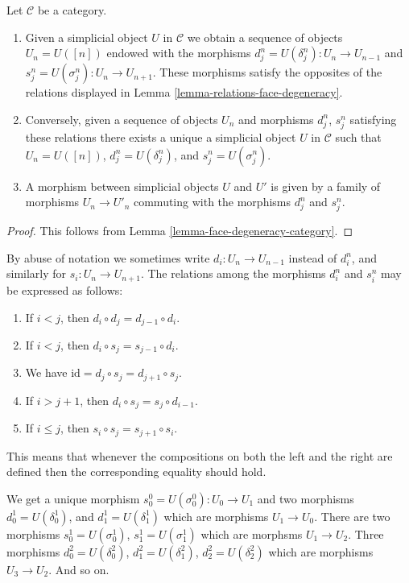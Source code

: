 \begin{lemma}
\label{lemma-characterize-simplicial-object}
Let $\mathcal{C}$ be a category.
\begin{enumerate}
\item Given a simplicial object $U$ in $\mathcal{C}$
we obtain a sequence of objects $U_n = U([n])$ endowed
with the morphisms $d^n_j = U(\delta^n_j) : U_n \to U_{n-1}$ and
$s^n_j = U(\sigma^n_j) : U_n \to U_{n + 1}$. These morphisms
satisfy the opposites of the relations displayed in
Lemma \ref{lemma-relations-face-degeneracy}.
\item Conversely, given a sequence of objects $U_n$ and morphisms
$d^n_j$, $s^n_j$ satisfying these relations there exists a unique
a simplicial object $U$ in $\mathcal{C}$ such that $U_n = U([n])$,
$d^n_j = U(\delta^n_j)$, and $s^n_j = U(\sigma^n_j)$.
\item A morphism between simplicial objects $U$ and $U'$
is given by a family of morphisms $U_n \to U'_n$ commuting
with the morphisms $d^n_j$ and $s^n_j$.
\end{enumerate}
\end{lemma}

\begin{proof}
This follows from Lemma \ref{lemma-face-degeneracy-category}.
\end{proof}

\begin{remark}
By abuse of notation we sometimes write $d_i : U_n \to U_{n - 1}$
instead of $d^n_i$, and similarly for $s_i : U_n \to U_{n + 1}$.
The relations among the morphisms $d^n_i$ and $s^n_i$
may be expressed as follows:
\begin{enumerate}
\item If $i < j$, then $d_i \circ d_j = d_{j - 1} \circ d_i$.
\item If $i < j$, then $d_i \circ s_j = s_{j - 1} \circ d_i$.
\item We have $\text{id} = d_j \circ s_j = d_{j + 1} \circ s_j$.
\item If $i > j + 1$, then $d_i \circ s_j = s_j \circ d_{i - 1}$.
\item If $i \leq j$, then $s_i \circ s_j = s_{j + 1} \circ s_i$.
\end{enumerate}
This means that whenever the compositions on both the left and the
right are defined then the corresponding equality should hold.
\end{remark}

\noindent
We get a unique morphism $s^0_0 = U(\sigma^0_0) : U_0 \to U_1$ and
two morphisms $d^1_0 = U(\delta^1_0)$, and
$d^1_1 = U(\delta^1_1)$ which are morphisms $U_1 \to U_0$.
There are two morphisms $s^1_0 = U(\sigma^1_0)$, $s^1_1 = U(\sigma^1_1)$
which are morphsms $U_1 \to U_2$. Three morphisms
$d^2_0 = U(\delta^2_0)$, $d^2_1 = U(\delta^2_1)$, $d^2_2 = U(\delta^2_2)$
which are morphisms $U_3 \to U_2$. And so on.

